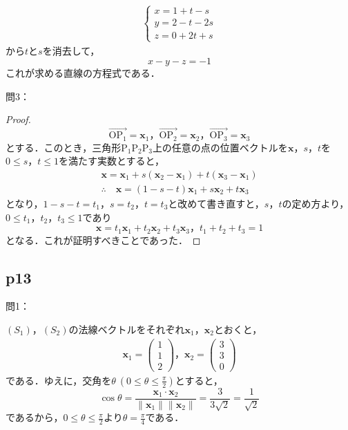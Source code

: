 \documentclass[dvipdfmx,uplatex,11pt]{jsarticle}
\theoremstyle{definition}
\begin{document}
\begin{leftbar}
    \begin{align*}
        \begin{cases}
            x=1+t-s \\
            y=2-t -2s \\
            z=0+2t+s
        \end{cases}
    \end{align*}
    から$t$と$s$を消去して，
    \[
        x-y-z=-1
    \]
    これが求める直線の方程式である．
\end{leftbar}

問3：

\begin{leftbar}
    \begin{proof}
        \[
            \overrightarrow{\mathrm{OP_1}}=\bm{x}_1，\overrightarrow{\mathrm{OP_2}}=\bm{x}_2，\overrightarrow{\mathrm{OP_3}}=\bm{x}_3
        \]
        とする．このとき，三角形$\mathrm{P_1 P_2 P_3}$上の任意の点の位置ベクトルを$\bm{x}$，$s$，$t$を$0 \le s，t \le 1$を満たす実数とすると，
        \begin{gather*}
            \bm{x}=\bm{x}_1 + s(\bm{x}_2 - \bm{x}_1) + t (\bm{x}_3 - \bm{x}_1) \\
            \therefore \quad \bm{x} = (1-s-t)\bm{x}_1 + s\bm{x}_2 + t \bm{x}_3
        \end{gather*}
        となり，$1-s-t=t_1$，$s=t_2$，$t=t_3$と改めて書き直すと，$s$，$t$の定め方より，$0 \le t_1 ，t_2，t_3 \le 1$であり
        \[
            \bm{x} = t_1\bm{x}_1 + t_2\bm{x}_2 + t_3 \bm{x}_3，t_1+t_2+t_3=1
        \]
        となる．これが証明すべきことであった．
    \end{proof}
\end{leftbar}
%
\newpage
%
\subsection{p13}
%
問1：
\begin{leftbar}
    $(S_1)$，$(S_2)$の法線ベクトルをそれぞれ$\bm{x}_1$，$\bm{x}_2$とおくと，
    \begin{gather*}
        \bm{x}_1 =
        \left(
            \begin{array}{c}
                1\\
                1\\
                2
            \end{array}
        \right)
        ，
        \bm{x}_2 =
        \left(
            \begin{array}{c}
                3\\
                3\\
                0
            \end{array}
        \right)
        \end{gather*}
        である．ゆえに，交角を$\theta ~(0 \le \theta \le \frac{\pi}{2})$とすると，
        \[
            \cos \theta = \frac{\bm{x}_1 \cdot \bm{x}_2}{\|\bm{x}_1\| \|\bm{x}_2\|}=\frac{3}{3\sqrt{2}}=\frac{1}{\sqrt{2}}
        \]
        であるから，$0 \le \theta \le \frac{\pi}{2}$より$\theta =\frac{\pi}{4}$である．
    \end{leftbar}
%
%
\newpage
%
%
%
\end{document}
